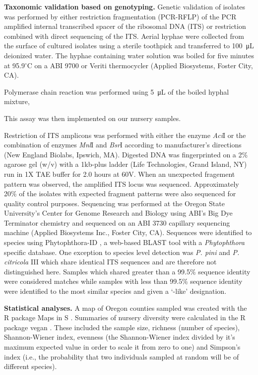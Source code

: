 \documentclass[12pt]{article}
\begin{document}


\textbf{Taxonomic validation based on genotyping.} Genetic validation of isolates was performed by either restriction fragmentation (PCR-RFLP) of the PCR amplified internal transcribed spacer of the ribosomal DNA (ITS) or restriction combined with direct sequencing of the ITS.  Aerial hyphae were collected from the surface of cultured isolates using a sterile toothpick and transferred to \SI{100}{\micro\liter} deionized water.  The hyphae containing water solution was boiled for five minutes at 95.9$^\circ$C on a ABI 9700 or Veriti thermocycler (Applied Biosystems, Foster City, CA).  






Polymerase chain reaction was performed using \SI{5}{\micro\liter} of the boiled hyphal mixture,

  This assay was then implemented on our nursery samples.

Restriction of ITS amplicons was performed with either the enzyme \emph{Aci}I or the combination of enzymes \emph{Mnl}I and \emph{Bsr}I according to manufacturer's directions (New England Biolabs, Ipswich, MA).  Digested DNA was fingerprinted on a 2\% agarose gel (w/v) with a 1kb-plus ladder (Life Technologies, Grand Island, NY) run in 1X TAE buffer for 2.0 hours at 60V.  When an unexpected fragement pattern was observed, the amplified ITS locus was sequenced.  Approximately 20\% of the isolates with expected fragment patterns were also sequenced for quality control purposes.  Sequencing was performed at the Oregon State University's Center for Genome Research and Biology using ABI's Big Dye Terminator chemistry and sequenced on an ABI 3730 capillary sequencing machine (Applied Biosystems Inc., Foster City, CA).  Sequences were identified to species using Phytophthora-ID \cite{grunwald_etal_2011}, a web-based BLAST \cite{altschul_etal_1990} tool with a \emph{Phytophthora} specific database.  One exception to species level detection was \emph{P. pini} and \emph{P. citricola} III which share identical ITS sequences\cite{hong2011} and are therefore not distinguished here.  Samples which shared greater than a 99.5\% sequence identity were considered matches while samples with less than 99.5\% sequence identity were identified to the most similar species and given a `-like' designation.


\textbf{Statistical analyses.} A map of Oregon counties sampled was created with the R package Maps in S \cite{R, r_maps}.  Summaries of nursery diversity were calculated in the R package vegan \cite{R, vegan}.  These included the sample size, richness (number of species), Shannon-Wiener index, evenness (the Shannon-Wiener index divided by it's maximum expected value in order to scale it from zero to one) and Simpson's index (i.e., the probability that two individuals sampled at random will be of different species).
\end{document}

